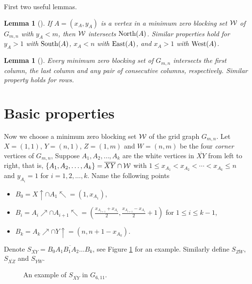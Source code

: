 \documentclass[preprint,12pt]{elsarticle}
\newtheorem{lemma}[theorem]{Lemma}
\def\NEarrow#1{#1{\nearrow}}
\def\NWarrow#1{#1{\nwarrow}}
\def\Northarrow#1{#1{\uparrow}}
\def\North{{\rm North}}
\def\South{{\rm South}}
\def\East{{\rm East}}
\def\West{{\rm West}}
\begin{document}
{First two useful lemmas.

\begin{lemma}[\cite{2020bccknt}] \label{lem2}
If $A=(x_A,y_A)$ is a vertex in a minimum zero blocking set ${\cal W}$ of $G_{m,n}$
with $y_A<m$, then ${\cal W}$ intersects $\North(A)$.
Similar properties hold for $y_A>1$ with $\South(A)$,
$x_A<n$ with $\East(A)$, and $x_A>1$ with $\West(A)$.
\end{lemma}

\begin{lemma}[\cite{2020bccknt}] \label{lem3}
Every minimum zero blocking set of $G_{m,n}$ intersects
the first column, the last column and any pair of consecutive columns, respectively.
Similar property holds for rows.
\end{lemma}

\section{Basic properties}\label{sec3}

Now we choose a minimum zero blocking set $\cal W$ of the grid graph $G_{m,n}$.
Let $X=(1,1)$, $Y=(n,1)$, $Z=(1,m)$ and $W=(n,m)$
be the four {\em corner} vertices of $G_{m,n}$,
Suppose $A_1,A_2,\ldots,A_k$ are the white vertices in $\overline{XY}$ from left to right,
that is, $\{A_1,A_2,\ldots,A_k\}=\overline{XY}\cap{\cal W}$ with
$1\le x_{A_1} <x_{A_2} <\cdots<x_{A_k} \le n$ and $y_{A_i}=1$ for $i=1,2,\ldots,k$.
Name the following points
\begin{itemize}
\item $B_0 = \Northarrow{X} \cap \NWarrow{A_1} = (1,x_{A_1})$,

\item $B_i = \NEarrow{A_i} \cap \NWarrow{A_{i+1}}
           = (\frac{x_{A_{i+1}}+x_{A_i}}{2},\frac{x_{A_{i+1}}-x_{A_i}}{2}+1)$
      for $1\le i\le k-1$,

\item $B_k = \NEarrow{A_k} \cap \Northarrow{Y} = (n,n+1-x_{A_k})$.
\end{itemize}
Denote $S_{\overline{XY}}=\overline{B_0A_1B_1A_2\ldots B_k}$,
see Figure \ref{fig1} for an example.
Similarly define $S_{\overline{ZW}}$, $S_{\overline{XZ}}$ and $S_{\overline{YW}}$.

\begin{figure}[htb]
\centering
{}
\caption{An example of $S_{\overline{XY}}$ in $G_{6,11}$.} \label{fig1}
\end{figure}


}
\end{document}
